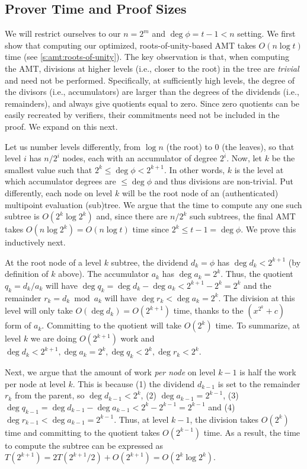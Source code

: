 \subsection{Prover Time and Proof Sizes}
\label{s:amt:proof-time-and-sizes}
We will restrict ourselves to our $n = 2^m$ and $\deg{\phi}=t-1 < n$ setting.
We first show that computing our optimized, roots-of-unity-based AMT takes $O(n\log{t})$ time (see \cref{s:amt:roots-of-unity}).
The key observation is that, when computing the AMT, divisions at higher levels (i.e., closer to the root) in the tree are \textit{trivial} and need not be performed.
Specifically, at sufficiently high levels, the degree of the divisors (i.e., accumulators) are larger than the degrees of the dividends (i.e., remainders), and always give quotients equal to zero.
Since zero quotients can be easily recreated by verifiers, their commitments need not be included in the proof.
We expand on this next.

Let us number levels differently, from $\log{n}$ (the root) to 0 (the leaves), so that level $i$ has $n/2^i$ nodes, each with an accumulator of degree $2^i$.
Now, let $k$ be the smallest value such that $2^k \le \deg{\phi} < 2^{k+1}$.
In other words, $k$ is the level at which accumulator degrees are $\le \deg{\phi}$ and thus divisions are non-trivial.
Put differently, each node on level $k$ will be the root node of an (authenticated) multipoint evaluation (sub)tree.
We argue that the time to compute any one such subtree is $O(2^k \log{2^k})$ and, since there are $n/2^k$ such subtrees, the final AMT takes $O(n\log{2^k}) = O(n\log{t})$ time since $2^k\le t-1=\deg{\phi}$.
We prove this inductively next.

At the root node of a level $k$ subtree, the dividend $d_k = \phi$ has $\deg{d_k} < 2^{k+1}$ (by definition of $k$ above).
The accumulator $a_k$ has $\deg{a_k} = 2^k$.
Thus, the quotient $q_k = d_k/a_k$ will have $\deg{q_k} = \deg{d_k}-\deg{a_k}< 2^{k+1} - 2^k = 2^k$ and the remainder $r_k = d_k \bmod a_k$ will have $\deg{r_k} < \deg{a_k} = 2^k$.
The division at this level will only take $O(\deg{d_k})=O(2^{k+1})$ time, thanks to the $(x^{2^k} + c)$ form of $a_k$.
Committing to the quotient will take $O(2^{k})$ time.
To summarize, at level $k$ we are doing $O(2^{k+1})$ work and $\deg{d_k} < 2^{k+1}, \deg{a_k} = 2^k, \deg{q_k} < 2^k, \deg{r_k} < 2^k$.

Next, we argue that the amount of work \textit{per node} on level $k-1$ is half the work per node at level $k$.
This is because (1) the dividend $d_{k-1}$ is set to the remainder $r_k$ from the parent, so $\deg{d_{k-1}} < 2^k$, (2) $\deg{a_{k-1}}=2^{k-1}$, (3) $\deg{q_{k-1}} = \deg{d_{k-1}}-\deg{a_{k-1}}<2^k-2^{k-1}=2^{k-1}$ and (4) $\deg{r_{k-1}} < \deg{a_{k-1}}=2^{k-1}$.
Thus, at level $k-1$, the division takes $O(2^k)$ time and committing to the quotient takes $O(2^{k-1})$ time.
As a result, the time to compute the subtree can be expressed as $T(2^{k+1}) = 2T(2^{k+1} / 2) + O(2^{k+1}) = O(2^{k}\log{2^{k}})$.

